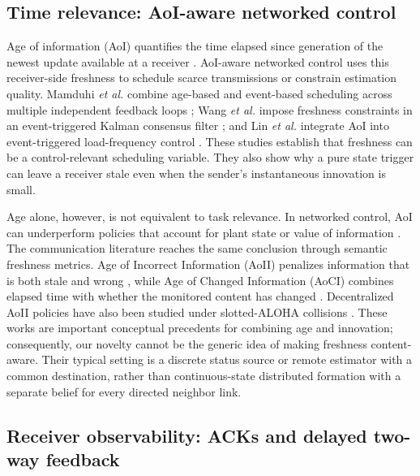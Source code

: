 \subsection{Time relevance: AoI-aware networked control}

Age of information (AoI) quantifies the time elapsed since generation of the
newest update available at a receiver
\cite{kaul2012realtime,sun2017update,yates2021aoisurvey}. AoI-aware networked
control uses this receiver-side freshness to schedule scarce transmissions or
constrain estimation quality. Mamduhi \emph{et al.} combine age-based and
event-based scheduling across multiple independent feedback loops
\cite{mamduhi2020freshness}; Wang \emph{et al.} impose freshness constraints in
an event-triggered Kalman consensus filter \cite{wang2021freshness}; and Lin
\emph{et al.} integrate AoI into event-triggered load-frequency control
\cite{lin2023eventtriggered}. These studies establish that freshness can be a
control-relevant scheduling variable. They also show why a pure state trigger
can leave a receiver stale even when the sender's instantaneous innovation is
small.

Age alone, however, is not equivalent to task relevance. In networked control,
AoI can underperform policies that account for plant state or value of
information \cite{ayan2019aoivoi,mamduhi2020freshness}. The communication
literature reaches the same conclusion through semantic freshness metrics.
Age of Incorrect Information (AoII) penalizes information that is both stale
and wrong \cite{maatouk2020aoii}, while Age of Changed Information (AoCI)
combines elapsed time with whether the monitored content has changed
\cite{wang2022aoci}. Decentralized AoII policies have also been studied under
slotted-ALOHA collisions \cite{nayak2023decentralizedaoii}. These works are
important conceptual precedents for combining age and innovation; consequently,
our novelty cannot be the generic idea of making freshness content-aware.
Their typical setting is a discrete status source or remote estimator with a
common destination, rather than continuous-state distributed formation with a
separate belief for every directed neighbor link.

\subsection{Receiver observability: ACKs and delayed two-way feedback}

